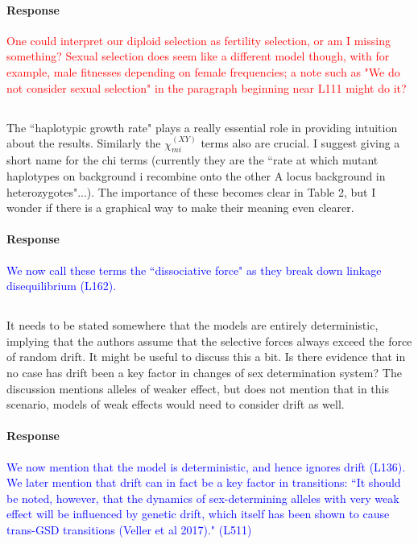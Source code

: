\documentclass[10pt,letterpaper]{article}
\begin{document}
\noindent\paragraph{Response}
\textcolor{red}{One could interpret our diploid selection as fertility selection, or am I missing something? Sexual selection does seem like a different model though, with for example, male fitnesses depending on female frequencies; a note such as "We do not consider sexual selection" in the paragraph beginning near L111 might do it?}

\noindent\subsection{}
The ``haplotypic growth rate" plays a really essential role in providing intuition about the results. Similarly the $\chi_{mi}^{(XY)}$ terms also are crucial.  I suggest giving a short name for the chi terms (currently they are the ``rate at which mutant haplotypes on background i recombine onto the other A locus background in heterozygotes"...).   The importance of these becomes clear in Table 2, but I wonder if there is a graphical way to make their meaning even clearer.  

\noindent\paragraph{Response}
\textcolor{blue}{We now call these terms the ``dissociative force" as they break down linkage disequilibrium (L162).}

\noindent\subsection{}
It needs to be stated somewhere that the models are entirely deterministic, implying that the authors assume that the selective forces always exceed the force of random drift. It might be useful to discuss this a bit. Is there evidence that in no case has drift been a key factor in changes of sex determination system?  The discussion mentions alleles of weaker effect, but does not mention that in this scenario, models of weak effects would need to consider drift as well.

\noindent\paragraph{Response}
\textcolor{blue}{We now mention that the model is deterministic, and hence ignores drift (L136). 
We later mention that drift can in fact be a key factor in transitions: ``It should be noted, however, that the dynamics of sex-determining alleles with very weak effect will be influenced by genetic drift, which itself has been shown to cause trans-GSD transitions (Veller et al 2017)." (L511)}
\end{document}

